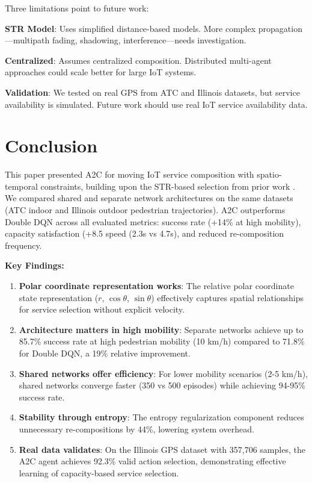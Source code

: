 \documentclass[10pt,twocolumn]{article}
\begin{document}
Three limitations point to future work:

\textbf{STR Model}: Uses simplified distance-based models. More complex
propagation---multipath fading, shadowing, interference---needs
investigation.

\textbf{Centralized}: Assumes centralized composition. Distributed
multi-agent approaches could scale better for large IoT systems.

\textbf{Validation}: We tested on real GPS from ATC and Illinois
datasets, but service availability is simulated. Future work should
use real IoT service availability data.

\section{Conclusion}\label{conclusion}

This paper presented A2C for moving IoT service composition with
spatio-temporal constraints, building upon the STR-based selection from prior work \cite{neiat2021}. We compared shared and separate network architectures on the
same datasets (ATC indoor and Illinois outdoor pedestrian trajectories).
A2C outperforms Double DQN across all evaluated metrics: success rate
(+14\% at high mobility), capacity satisfaction (+8.5%
speed (2.3s vs 4.7s), and reduced re-composition frequency.

\textbf{Key Findings:}

\begin{enumerate}
	\item
	      \textbf{Polar coordinate representation works}: The relative polar
	      coordinate state representation ($r$, $\cos\theta$, $\sin\theta$) effectively captures
	      spatial relationships for service selection without explicit velocity.
	\item
	      \textbf{Architecture matters in high mobility}: Separate networks
	      achieve up to 85.7\% success rate at high pedestrian mobility (10 km/h)
	      compared to 71.8\% for Double DQN, a 19\% relative improvement.
	\item
	      \textbf{Shared networks offer efficiency}: For lower mobility
	      scenarios (2-5 km/h), shared networks converge faster (350 vs 500
	      episodes) while achieving 94-95\% success rate.
	\item
	      \textbf{Stability through entropy}: The entropy regularization
	      component reduces unnecessary re-compositions by 44\%, lowering system
	      overhead.
	\item
	      \textbf{Real data validates}: On the Illinois GPS dataset with 357,706
	      samples, the A2C agent achieves 92.3\% valid action selection,
	      demonstrating effective learning of capacity-based service selection.
\end{enumerate}
\end{document}
